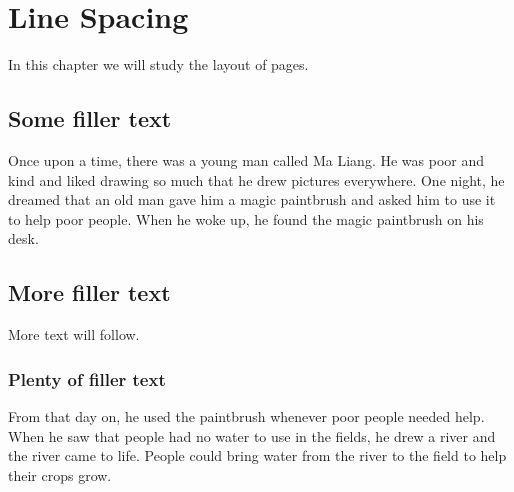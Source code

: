 \documentclass[a4paper,12pt]{book}
\begin{document}
\chapter{Line Spacing}
In this chapter we will study the layout of pages.
\section{Some filler text}
Once upon a time, there was a young man called Ma Liang. He was poor and kind and liked drawing so much that he drew pictures everywhere. One night, he dreamed that an old man gave him a magic paintbrush and asked him to use it to help poor people. When he woke up, he found the magic paintbrush on his desk.
\section{More filler text}
More text will follow.
\subsection{Plenty of filler text}
From that day on, he used the paintbrush whenever poor people needed help. When he saw that people had no water to use in the fields, he drew a river and the river came to life. People could bring water from the river to the field to help their crops grow.
\end{document}

